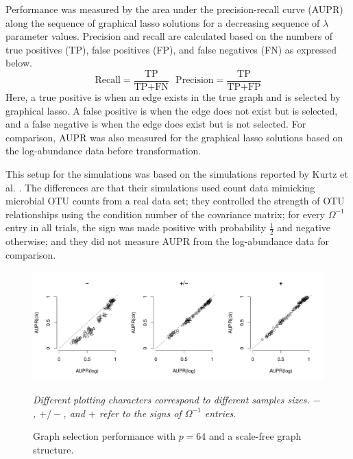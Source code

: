 \documentclass[12pt]{article}
\begin{document}
Performance was measured by the area under the precision-recall curve (AUPR) along the sequence of graphical lasso solutions for a decreasing sequence of $\lambda$ parameter values. Precision and recall are calculated based on the numbers of true positives (TP), false positives (FP), and false negatives (FN) as expressed below.
\begin{equation}
\text{Recall} = \frac{\text{TP}}{\text{TP}+\text{FN}}\ \ \ \text{Precision} = \frac{\text{TP}}{\text{TP}+\text{FP}}
\end{equation}
Here, a true positive is when an edge exists in the true graph and is selected by graphical lasso. A false positive is when the edge does not exist but is selected, and a false negative is when the edge does exist but is not selected. For comparison, AUPR was also measured for the graphical lasso solutions based on the log-abundance data before transformation.

This setup for the simulations was based on the simulations reported by Kurtz et al. \citeyear{kurtz}. The differences are that their simulations used count data mimicking microbial OTU counts from a real data set; they controlled the strength of OTU relationships using the condition number of the covariance matrix; for every $\Omega^{-1}$ entry in all trials, the sign was made positive with probability $\frac{1}{2}$ and negative otherwise; and they did not measure AUPR from the log-abundance data for comparison.

\begin{figure}
\caption{Graph selection performance with $p = 64$ and a scale-free graph structure.}
\label{f:perf64}
\begin{center}
\includegraphics[width=6.5in]{figs/sim-64-scalefree.pdf}
\begin{small}
\textit{Different plotting characters correspond to different samples sizes. $-$, $+/-$, and $+$ refer to the signs of $\Omega^{-1}$ entries.}
\end{small}
\end{center}
\end{figure}
\end{document}
